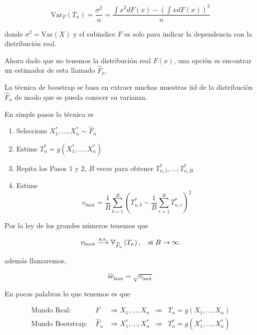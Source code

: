 \documentclass[
  12pt,
]{book}
\providecommand{\tightlist}{%
  \setlength{\itemsep}{0pt}\setlength{\parskip}{0pt}}
\theoremstyle{definition}
\theoremstyle{definition}
\theoremstyle{definition}
\theoremstyle{remark}
\begin{document}
\begin{equation*}
\mathrm{Var}_{F}\left(T_{n}\right)
= \frac{\sigma^{2}}{n}=\frac{\int x^{2}  dF(x)-\left(\int x
dF(x)\right)^{2}}{n}
\end{equation*}

donde \(\sigma^{2} = \mathrm{Var}\left(X\right)\) y el subindice \(F\) es solo para indicar la dependencia con la distribución real.

Ahora dado que no tenemos la distribución real \(F(x)\), una opción es encontrar un estimador de esta llamado \(\hat{F}_n\).

La técnica de boostrap se basa en extraer muchas muestras iid de la distribución \(\hat{F}_n\) de modo que se pueda conocer su varianza.

En simple pasos la técnica es

\begin{enumerate}
\def\labelenumi{\arabic{enumi}.}
\tightlist
\item
  Seleccione \(X_{1}^{*}, \ldots, X_{n}^{*} \sim \widehat{F}_{n}\)
\item
  Estime \(T_{n}^{*}=g\left(X_{1}^{*}, \ldots, X_{n}^{*}\right)\)
\item
  Repita los Pasos 1 y 2, \(B\) veces para obtener \(T_{n, 1}^{*}, \ldots, T_{n, B}^{*}\)
\item
  Estime
  \[
  v_{\mathrm{boot}}=\frac{1}{B} \sum_{b=1}^{B}\left(T_{n, b}^{*}-\frac{1}{B} \sum_{r=1}^{B} T_{n, r}^{*}\right)^{2}
  \]
\end{enumerate}

Por la ley de los grandes números tenemos que

\begin{equation}
v_{\mathrm{boot}} \stackrel{\mathrm{a.s.}}{\longrightarrow} \mathbb{V}_{\widehat{F}_{n}}\left(T_{n}\right), \text {\quad si } B \rightarrow \infty.
\end{equation}

además llamaremos,

\begin{equation*}
\widehat{\mathrm{se}}_{\mathrm{boot}}=\sqrt{v_{\mathrm{boot}}}
\end{equation*}

En pocas palabras lo que tenemos es que

\begin{align*}
\text  {Mundo Real: }
& F
& \Longrightarrow  X_{1}, \ldots, X_{n}
& \Longrightarrow
& T_{n} = g\left(X_{1}, \ldots, X_{n}\right) \\
\text {Mundo Bootstrap: }
& \widehat{F}_{n}
& \Longrightarrow  X_{1}^{*}, \ldots, X_{n}^{*}
& \Longrightarrow
& T_{n}^{*}=g\left(X_{1}^{*}, \ldots, X_{n}^{*}\right)
\end{align*}
\end{document}
